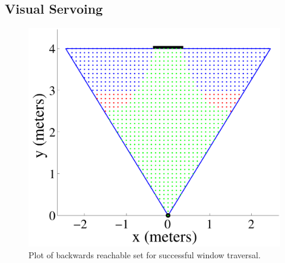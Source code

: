 \documentclass{aamas2013}
\begin{document}
\subsection{Visual Servoing}
\label{sec:visual_servoing}

\begin{figure}[h]

\begin{minipage}[b]{0.45\linewidth}
\centering
\includegraphics[width=\textwidth]{figures/feasible_set.pdf}
\caption{Plot of backwards reachable set for successful window traversal.}
\label{fig:feasible_set}
\end{minipage}


\end{figure}
\end{document}
